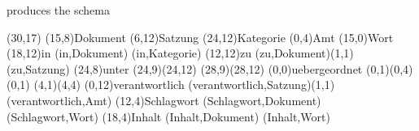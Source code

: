 \documentclass[a4paper,11pt]{article}
\begin{document}
produces the schema

\setlength{\hermunit}{.5cm}
\begin{schema}(30,17)
\entity(15,8){Dokument}
%
\entity(6,12){Satzung}
%
\entity(24,12){Kategorie}
%
\entity(0,4){Amt}
%
\entity(15,0){Wort}
%
\relation(18,12){in}
\conn(in,Dokument){}
\conn(in,Kategorie){}
%
\relation(12,12){zu}
\conn(zu,Dokument){(1,1)}
\conn(zu,Satzung){}
%
\relation(24,8){unter}
\conn*(24,9)(24,12){}
\conn*(28,9)(28,12){}
%
\relation(0,0){uebergeordnet}
\conn*(0,1)(0,4){(0,1)}
\conn*(4,1)(4,4){}
%
\relation(0,12){verantwortlich}
\conn(verantwortlich,Satzung){(1,1)}
\conn(verantwortlich,Amt){}
%
\relation(12,4){Schlagwort}
\conn(Schlagwort,Dokument){}
\conn(Schlagwort,Wort){}
%
\relation(18,4){Inhalt}
\conn(Inhalt,Dokument){}
\conn(Inhalt,Wort){}
\end{schema}
\end{document}
